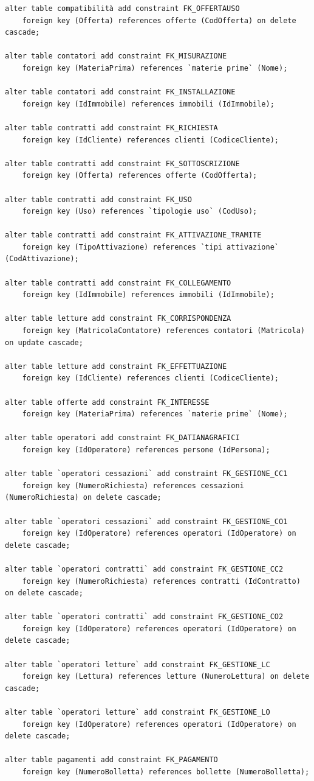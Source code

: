 \documentclass[a4paper,12pt]{report}
\begin{document}
\begin{lstlisting}
alter table compatibilità add constraint FK_OFFERTAUSO
    foreign key (Offerta) references offerte (CodOfferta) on delete cascade;
     
alter table contatori add constraint FK_MISURAZIONE
    foreign key (MateriaPrima) references `materie prime` (Nome);

alter table contatori add constraint FK_INSTALLAZIONE
    foreign key (IdImmobile) references immobili (IdImmobile);
     
alter table contratti add constraint FK_RICHIESTA
    foreign key (IdCliente) references clienti (CodiceCliente);

alter table contratti add constraint FK_SOTTOSCRIZIONE
    foreign key (Offerta) references offerte (CodOfferta);

alter table contratti add constraint FK_USO
    foreign key (Uso) references `tipologie uso` (CodUso);

alter table contratti add constraint FK_ATTIVAZIONE_TRAMITE
    foreign key (TipoAttivazione) references `tipi attivazione` (CodAttivazione);

alter table contratti add constraint FK_COLLEGAMENTO
    foreign key (IdImmobile) references immobili (IdImmobile);

alter table letture add constraint FK_CORRISPONDENZA
    foreign key (MatricolaContatore) references contatori (Matricola) on update cascade;
     
alter table letture add constraint FK_EFFETTUAZIONE
    foreign key (IdCliente) references clienti (CodiceCliente);

alter table offerte add constraint FK_INTERESSE
    foreign key (MateriaPrima) references `materie prime` (Nome);
     
alter table operatori add constraint FK_DATIANAGRAFICI
    foreign key (IdOperatore) references persone (IdPersona);
    
alter table `operatori cessazioni` add constraint FK_GESTIONE_CC1
    foreign key (NumeroRichiesta) references cessazioni (NumeroRichiesta) on delete cascade;
    
alter table `operatori cessazioni` add constraint FK_GESTIONE_CO1
    foreign key (IdOperatore) references operatori (IdOperatore) on delete cascade;

alter table `operatori contratti` add constraint FK_GESTIONE_CC2
    foreign key (NumeroRichiesta) references contratti (IdContratto) on delete cascade;
    
alter table `operatori contratti` add constraint FK_GESTIONE_CO2
    foreign key (IdOperatore) references operatori (IdOperatore) on delete cascade;

alter table `operatori letture` add constraint FK_GESTIONE_LC
    foreign key (Lettura) references letture (NumeroLettura) on delete cascade;
    
alter table `operatori letture` add constraint FK_GESTIONE_LO
    foreign key (IdOperatore) references operatori (IdOperatore) on delete cascade;

alter table pagamenti add constraint FK_PAGAMENTO
    foreign key (NumeroBolletta) references bollette (NumeroBolletta);
\end{lstlisting}
\end{document}
